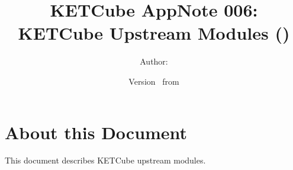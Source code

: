   




\title{\UWBLogo KETCube AppNote 006:\\ KETCube Upstream Modules (\vhCurrentVersion)}

\author{Author: \vhListAllAuthorsLongWithAbbrev}
\date{Version \vhCurrentVersion\ from \vhCurrentDate}

  




  


\section*{About this Document}


This document describes KETCube upstream modules. 

\setcounter{tocdepth}{2}
\tableofcontents
\clearpage

\listoffigures
\listoftables
\begin{versionhistory}
\end{versionhistory}
\setcounter{table}{0}

